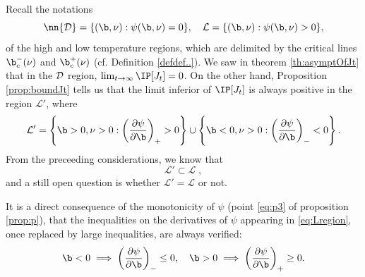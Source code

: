 Recall the notations
\begin{equation} \nn
{\cal D} = \{ (\b,\nu): \psi(\b, \nu)=0 \}, \quad {\cal L}  = \{ (\b,\nu): \psi(\b, \nu)>0\},
\end{equation}
of the high and low temperature regions, which are delimited by the critical lines $\b_c^-(\nu)$ and $\b_c^+(\nu)$ (cf. Definition \ref{defdef..}).
We saw in theorem \ref{th:asymptOfJt} that in the ${\cal D}$ region, $\lim_{t\to\infty} \IP[J_t] = 0$. On the other hand, Proposition \ref{prop:boundJt} tells us that the limit inferior of $\IP[J_t]$ is always positive in the region $\mathcal{L}'$, where
\begin{equation} \label{eq:Lregion}
\mathcal{L}' = \left\{ \b > 0,\nu > 0 :  \left(  \frac{\partial \psi}{\partial \b}\right)_+ > 0 \right\}\cup\left\{ \b < 0, \nu > 0 :  \left(  \frac{\partial \psi}{\partial \b}\right)_- < 0 \right\}.
\end{equation}
From the preceeding considerations, we know that
\begin{equation}%
\mathcal{L}' \subset \mathcal{L}\;,
\end{equation}
and a still open question is whether 
$\mathcal{L}' = \mathcal{L}$ or not.

\begin{remark}
It is a direct consequence of the monotonicity of $\psi$ (point \ref{eq:p3} of proposition \ref{prop:p}), that the inequalities on the derivatives of $\psi$ appearing in \eqref{eq:Lregion}, once replaced by large inequalities, are always verified:
$$ \b<0 \implies  \left(  \frac{\partial \psi}{\partial \b}\right)_- \leq 0,
\quad
 \b>0 \implies  \left(  \frac{\partial \psi}{\partial \b}\right)_+ \geq 0.$$
\end{remark}

